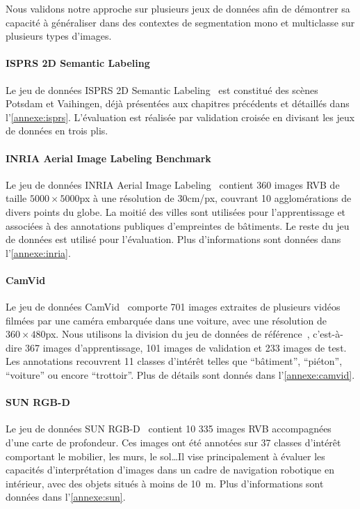 Nous validons notre approche sur plusieurs jeux de données afin de démontrer sa capacité à généraliser dans des contextes de segmentation mono et multiclasse sur plusieurs types d'images.

\paragraph{ISPRS 2D Semantic Labeling}

Le jeu de données ISPRS 2D Semantic Labeling~\cite{rottensteiner_isprs_2012} est constitué des scènes Potsdam et Vaihingen, déjà présentées aux chapitres précédents et détaillés dans l'\cref{annexe:isprs}. L'évaluation est réalisée par validation croisée en divisant les jeux de données en trois plis.

\paragraph{INRIA Aerial Image Labeling Benchmark}
Le jeu de données INRIA Aerial Image Labeling~\cite{maggiori_can_2017} contient 360 images RVB de taille $5000\times5000$px à une résolution de 30cm/px, couvrant 10 agglomérations de divers points du globe. La moitié des villes sont utilisées pour l'apprentissage et associées à des annotations publiques d'empreintes de bâtiments. Le reste du jeu de données est utilisé pour l'évaluation. Plus d'informations sont données dans l'\cref{annexe:inria}.

\paragraph{CamVid}
Le jeu de données CamVid~\cite{brostow_semantic_2009} comporte 701 images extraites de plusieurs vidéos filmées par une caméra embarquée dans une voiture, avec une résolution de $360\times480$px. Nous utilisons la division du jeu de données de référence~\cite{badrinarayanan_segnet_2017}, c'est-à-dire 367 images d'apprentissage, 101 images de validation et 233 images de test. Les annotations recouvrent 11 classes d'intérêt telles que ``bâtiment'', ``piéton'', ``voiture'' ou encore ``trottoir''. Plus de détails sont donnés dans l'\cref{annexe:camvid}.

\paragraph{SUN RGB-D}
Le jeu de données SUN RGB-D~\cite{song_sun_2015} contient 10 335 images RVB accompagnées d'une carte de profondeur. Ces images ont été annotées sur 37 classes d'intérêt comportant le mobilier, les murs, le sol\dots Il vise principalement à évaluer les capacités d'interprétation d'images dans un cadre de navigation robotique en intérieur, avec des objets situés à moins de \SI{10}{\meter}. Plus d'informations sont données dans l'\cref{annexe:sun}.

